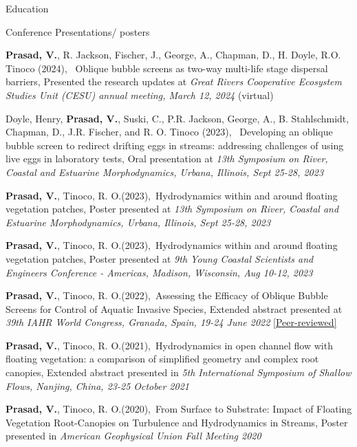\documentclass{resume} %
\begin{document}
\begin{rSection}{Education}
\begin{rSection}{Conference Presentations/ posters}
\item \textbf{Prasad, V.}, R. Jackson, Fischer, J., George, A., Chapman, D., H. Doyle, R.O. Tinoco (2024), \ Oblique bubble screens as two-way multi-life stage dispersal barriers, Presented the research updates at \textit{Great Rivers Cooperative Ecosystem Studies Unit (CESU) annual meeting, March 12, 2024} (virtual) \\

\item Doyle, Henry, \textbf{Prasad, V.}, Suski, C., P.R. Jackson, George, A., B. Stahlschmidt, Chapman, D., J.R. Fischer, and R. O. Tinoco (2023),
\ Developing an oblique bubble screen to redirect drifting eggs in streams: addressing challenges of using live eggs in laboratory tests, Oral presentation at \textit{13th Symposium on River, Coastal and Estuarine Morphodynamics, Urbana, Illinois, Sept 25-28, 2023} \\
\item \textbf{Prasad, V.}, Tinoco, R. O.(2023),\ Hydrodynamics within and around floating vegetation patches, Poster presented at \textit{13th Symposium on River, Coastal and Estuarine Morphodynamics, Urbana, Illinois, Sept 25-28, 2023} \\

\item \textbf{Prasad, V.}, Tinoco, R. O.(2023),\ Hydrodynamics within and around floating vegetation patches, Poster presented at \textit{9th Young Coastal Scientists and Engineers Conference - Americas, Madison, Wisconsin, Aug 10-12, 2023} \\

\item \textbf{Prasad, V.}, Tinoco, R. O.(2022),\ Assessing the Efficacy of Oblique Bubble Screens for Control of Aquatic Invasive Species, Extended abstract presented at \textit{39th IAHR World Congress, Granada, Spain, 19-24 June 2022} \href{https://www.iahr.org/library/infor?pid=20909}{[Peer-reviewed]}\\

\item \textbf{Prasad, V.}, Tinoco, R. O.(2021),\ {Hydrodynamics in open channel flow with floating vegetation: a comparison of simplified geometry and complex root canopies, Extended abstract presented in \textit{5th International Symposium of Shallow Flows, Nanjing, China, 23-25 October 2021}} \\


\item \textbf{Prasad, V.}, Tinoco, R. O.(2020),\ {From Surface to Substrate: Impact of Floating Vegetation Root-Canopies on Turbulence and Hydrodynamics in Streams, Poster presented in \textit{American Geophysical Union Fall Meeting 2020}} \\


\end{rSection}
\end{rSection}
\end{document}
